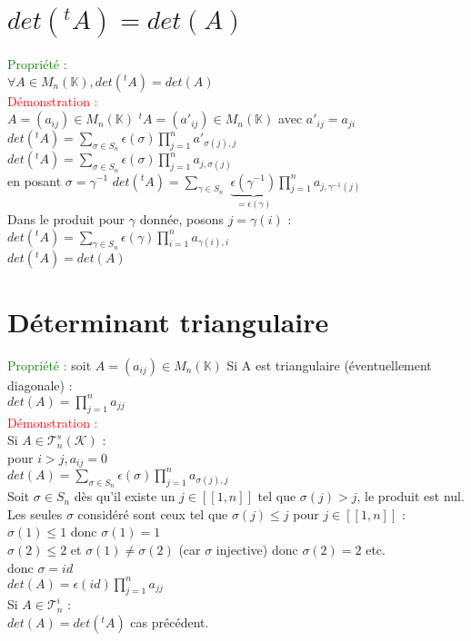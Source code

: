 \documentclass{article}
\begin{document}
	\section{$det({}^tA)=det(A)$}
	\textcolor{green}{Propriété :} \\
	$\forall A \in M_n(\mathbb K), det({}^tA)=det(A)$ \\
	\textcolor{red}{Démonstration :} \\
	$A=(a_{ij}) \in M_n(\mathbb K)$  ${}^tA=(a'_{ij}) \in M_n(\mathbb K)$ avec $a'_{ij}=a_{ji}$ \\
	$det({}^tA)= \sum_{\sigma \in S_n} \epsilon(\sigma) \prod_{j=1}^n a'_{\sigma(j),j}$ \\
	$det({}^tA)= \sum_{\sigma \in S_n} \epsilon(\sigma) \prod_{j=1}^n a_{j,\sigma(j)}$  \\
	en posant $\sigma= \gamma^{-1}$ $det({}^tA)= \sum_{\gamma \in S_n}$ $ \underbrace{\epsilon(\gamma^{-1})}_{=\epsilon(\gamma)} \prod_{j=1}^n a_{j,\gamma^{-1}(j)}$ \\
	Dans le produit pour $\gamma$ donnée, posons $j= \gamma(i)$ : \\
	$det({}^tA)= \sum_{\gamma \in S_n} \epsilon(\gamma) \prod_{i=1}^n a_{\gamma(i),i}$ \\
	$det({}^tA)=det(A)$
	\section{Déterminant triangulaire}
	\textcolor{green}{Propriété :} soit $A=(a_{ij}) \in M_n(\mathbb K)$
	Si A est triangulaire (éventuellement diagonale) : \\
	$det(A)= \prod_{j=1}^n a_{jj}$ \\
	\textcolor{red}{Démonstration :} \\
	Si $A \in \mathcal T^s_n(\mathcal K)$ : \\
	pour $i>j, a_{ij}=0$ \\
	$det(A)=\sum_{\sigma \in S_n} \epsilon(\sigma) \prod_{j=1}^n a_{\sigma(j),j}$ \\
	Soit $\sigma \in S_n$ dès qu'il existe un $j \in [[1,n]]$ tel que $\sigma(j)>j$, le produit est nul. Les seules $\sigma$ considéré sont ceux tel que $\sigma(j)\leq j$ pour $j \in [[1,n]]$ : \\
	$\sigma(1) \leq 1$ donc $\sigma(1)=1$ \\
	$\sigma(2) \leq 2$ et $\sigma(1)\neq \sigma(2)$ (car $\sigma$ injective) donc $\sigma(2)=2$ etc. \\
	donc $\sigma=id$ \\
	$det(A) = \epsilon(id) \prod_{j=1}^n a_{jj} $ \\
	Si $A \in \mathcal T^i_n$ : \\
	$det(A)=det({}^t A)$ cas précédent.
	
\end{document}
